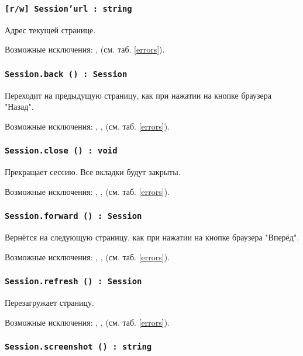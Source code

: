 \subsubsection{\texttt{[r/w] Session'url : string}}

Адрес текущей странице.

Возможные исключения: ,  (см. таб. \ref{errors}).

\subsubsection{\texttt{Session.back () : Session}}

Переходит на предыдущую страницу, как при нажатии на кнопке браузера "Назад".

Возможные исключения: , ,  (см. таб. \ref{errors}).

\subsubsection{\texttt{Session.close () : void}}

Прекращает сессию. Все вкладки будут закрыты.

Возможные исключения: , ,  (см. таб. \ref{errors}).

\subsubsection{\texttt{Session.forward () : Session}}

Вернётся на следующую страницу, как при нажатии на кнопке браузера "Вперёд".

Возможные исключения: , ,  (см. таб. \ref{errors}).

\subsubsection{\texttt{Session.refresh () : Session}}

Перезагружает страницу.

Возможные исключения: , ,  (см. таб. \ref{errors}).

\subsubsection{\texttt{Session.screenshot () : string}}

